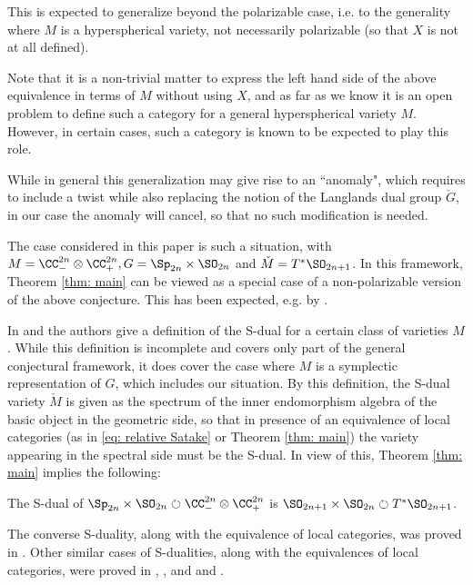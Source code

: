 \documentclass[11pt]{article}
\begin{document}
This is expected to generalize beyond the polarizable case, i.e. to the generality where $M$ is a hyperspherical variety, not necessarily polarizable (so that $X$ is not at all defined).

Note that it is a non-trivial matter to express the left hand side of the above equivalence in terms of $M$ without using $X$, and as far as we know it is an open problem to define such a category for a general hyperspherical variety $M$. However, in certain cases, such a category is known to be expected to play this role.
\begin{remark}
While in general this generalization may give rise to an ``anomaly", which requires to include a twist while also replacing the notion of the Langlands dual group $\check{G}$, in our case the anomaly will cancel, so that no such modification is needed.
\end{remark}

The case considered in this paper is such a situation, with $M=\CC_-^{2n}\otimes \CC_+^{2n}, G=\Sp_{2n}\times \SO_{2n}$ and $\check{M}=T^*\SO_{2n+1}$.
In this framework, Theorem \ref{thm: main} can be viewed as a special case of a non-polarizable version of the above conjecture. This has been expected, e.g. by \cite[Table 1, row 6]{FiU}.

In \cite{BDFRT} and \cite{Nak} the authors give a definition of the S-dual for a certain class of varieties $M$. While this definition is incomplete and covers only part of the general conjectural framework, it does cover the case where $M$ is a symplectic representation of $G$, which includes our situation.
By this definition, the S-dual variety $\check{M}$ is given as the spectrum of the inner endomorphism algebra of the basic object in the geometric side, so that in presence of an equivalence of local categories (as in \eqref{eq: relative Satake} or Theorem \ref{thm: main}) the variety appearing in the spectral side must be the S-dual.
In view of this, Theorem \ref{thm: main} implies the following:
\begin{theorem}\label{thm: reformulation}
    The S-dual of $\Sp_{2n}\times \SO_{2n}\circlearrowright\CC_-^{2n}\otimes \CC_+^{2n}$ is $\SO_{2n+1}\times \SO_{2n}\circlearrowright T^*\SO_{2n+1}$.
\end{theorem}

The converse S-duality, along with the equivalence of local categories, was proved in \cite{BFT}. Other similar cases of S-dualities, along with the equivalences of local categories, were proved in \cite{BFT2}, \cite{BFKT}, and \cite{Fu} and \cite{CW}.
\end{document}
